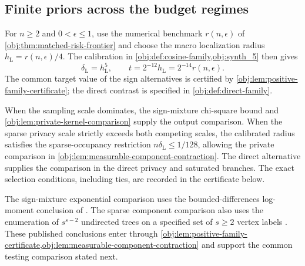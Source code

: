 \subsection{Finite priors across the budget regimes}

For \(n\ge2\) and \(0<\epsilon\le1\), use the numerical benchmark \(r(n,\epsilon)\) of \cref{obj:thm:matched-risk-frontier} and choose the macro localization radius \(h_{\mathrm L}=r(n,\epsilon)/4\). The calibration in \cref{obj:def:cosine-family,obj:synth_5} then gives
\[
\delta_{\mathrm L}=h_{\mathrm L}^{5},
\qquad
t=2^{-12}h_{\mathrm L}
=2^{-14}r(n,\epsilon).
\]
The common target value of the sign alternatives is certified by \cref{obj:lem:positive-family-certificate}; the direct contrast is specified in \cref{obj:def:direct-family}.

When the sampling scale dominates, the sign-mixture chi-square bound and \cref{obj:lem:private-kernel-comparison} supply the output comparison. When the sparse privacy scale strictly exceeds both competing scales, the calibrated radius satisfies the sparse-occupancy restriction \(n\delta_{\mathrm L}\le1/128\), allowing the private comparison in \cref{obj:lem:measurable-component-contraction}. The direct alternative supplies the comparison in the direct privacy and saturated branches. The exact selection conditions, including ties, are recorded in the certificate below.

The sign-mixture exponential comparison uses the bounded-differences log-moment conclusion of \citet[Theorem 6.2, displayed log-mgf conclusion in its proof, p.~167]{BoucheronLugosiMassart2013}. The sparse component comparison also uses the enumeration of \(s^{s-2}\) undirected trees on a specified set of \(s\ge2\) vertex labels \citep[Section 5.6, Theorem 5.40]{KellerTrotterAppliedCombinatorics}. These published conclusions enter through \cref{obj:lem:positive-family-certificate,obj:lem:measurable-component-contraction} and support the common testing comparison stated next.

